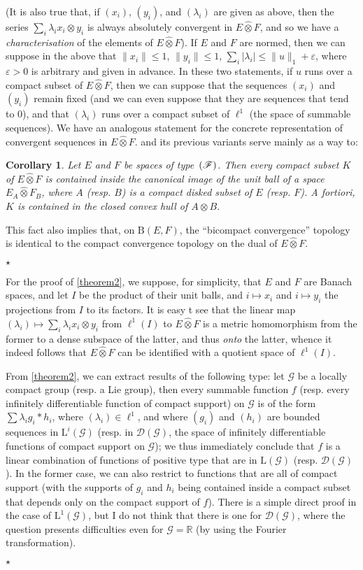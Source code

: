 \documentclass{article}
\theoremstyle{plain}
\newtheorem*{corollary}{Corollary}
\newcommand{\aster}[1]{$\star${#1}$\star$}
\newcommand{\BB}{\mathrm{B}}
\newcommand{\LL}{\mathrm{L}}
\newcommand{\FF}{\mbox{\normalfont($\mathscr{F}$)}}
\newcommand{\hotimes}{\widehat{\otimes}}
\newcommand{\scr}{\mathscr}
\newcommand{\oldpage}[1]{\marginpar{\footnotesize$\Big\vert$ \textit{p.~#1}}}
\begin{document}
(It is also true that, if $(x_i)$, $(y_i)$, and $(\lambda_i)$ are given as above, then the series $\sum_i\lambda_i x_i\otimes y_i$ is always absolutely convergent in $E\hotimes F$, and so we have a \emph{characterisation} of the elements of $E\hotimes F$).
If $E$ and $F$ are normed, then we can suppose in the above that $\|x_i\|\leq1$, $\|y_i\|\leq1$, $\sum_i|\lambda_i|\leq\|u\|_1+\varepsilon$, where $\varepsilon>0$ is arbitrary and given in advance.
In these two statements, if $u$ runs over a compact subset of $E\hotimes F$, then we can suppose that the sequences $(x_i)$ and $(y_i)$ remain fixed (and we can even suppose that they are sequences that tend to $0$), and that $(\lambda_i)$ runs over a compact subset of $\ell^1$ (the space of summable sequences).
We have an analogous statement for the concrete representation of convergent sequences in $E\hotimes F$.
 and its previous variants serve mainly as a way to:
\begin{corollary}
  Let $E$ and $F$ be spaces of type~$\FF$.
  Then every compact subset $K$ of $E\hotimes F$ is contained inside the canonical image of the unit ball of a space $E_A\hotimes F_B$, where $A$ (resp. $B$) is a compact disked subset of $E$ (resp. $F$).
  A fortiori, $K$ is contained in the closed convex hull of $A\otimes B$.
\end{corollary}

This fact also implies that, on $\BB(E,F)$, the ``bicompact convergence'' topology is identical to the compact convergence topology on the dual of $E\hotimes F$.

\aster{%
  For the proof of \cref{theorem2}, we suppose, for simplicity, that $E$ and $F$ are Banach spaces, and let $I$ be the product of their unit balls, and $i\mapsto x_i$ and $i\mapsto y_i$ the projections from $I$ to its factors.
  It is easy t see that the linear map $(\lambda_i)\mapsto\sum_i\lambda_i x_i\otimes y_i$ from $\ell^1(I)$ to $E\hotimes F$ is a metric homomorphism from the former to a dense subspace of the latter, and thus \emph{onto} the latter, whence it indeed follows that $E\hotimes F$ can be identified with a quotient space of $\ell^1(I)$.

  From \cref{theorem2}, we can extract results of the following type:
  let $\scr{G}$ be a
\oldpage{79}
  locally compact group (resp. a Lie group), then every summable function $f$ (resp. every infinitely differentiable function of compact support) on $\scr{G}$ is of the form $\sum\lambda_i g_i*h_i$, where $(\lambda_i)\in\ell^1$, and where $(g_i)$ and $(h_i)$ are bounded sequences in $\LL^i(\scr{G})$ (resp. in $\scr{D}(\scr{G})$, the space of infinitely differentiable functions of compact support on $\scr{G}$);
  we thus immediately conclude that $f$ is a linear combination of functions of positive type that are in $\LL(\scr{G})$ (resp. $\scr{D}(\scr{G})$).
  In the former case, we can also restrict to functions that are all of compact support (with the supports of $g_i$ and $h_i$ being contained inside a compact subset that depends only on the compact support of $f$).
  There is a simple direct proof in the case of $\LL^1(\scr{G})$, but I do not think that there is one for $\scr{D}(\scr{G})$, where the question presents difficulties even for $\scr{G}=\mathbb{R}$ (by using the Fourier transformation).
}
\end{document}

